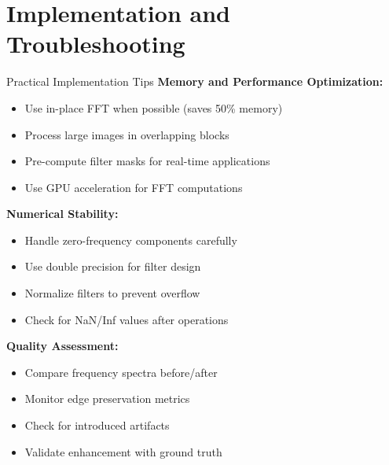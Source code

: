 \documentclass[aspectratio=169,10pt]{beamer}
\begin{document}
\section{Implementation and Troubleshooting}

\begin{frame}{Practical Implementation Tips}
\textbf{Memory and Performance Optimization:}
\begin{itemize}
\item Use in-place FFT when possible (saves 50\% memory)
\item Process large images in overlapping blocks
\item Pre-compute filter masks for real-time applications
\item Use GPU acceleration for FFT computations
\end{itemize}

\vspace{0.5cm}
\textbf{Numerical Stability:}
\begin{itemize}
\item Handle zero-frequency components carefully
\item Use double precision for filter design
\item Normalize filters to prevent overflow
\item Check for NaN/Inf values after operations
\end{itemize}

\vspace{0.5cm}
\textbf{Quality Assessment:}
\begin{itemize}
\item Compare frequency spectra before/after
\item Monitor edge preservation metrics
\item Check for introduced artifacts
\item Validate enhancement with ground truth
\end{itemize}
\end{frame}
\end{document}
